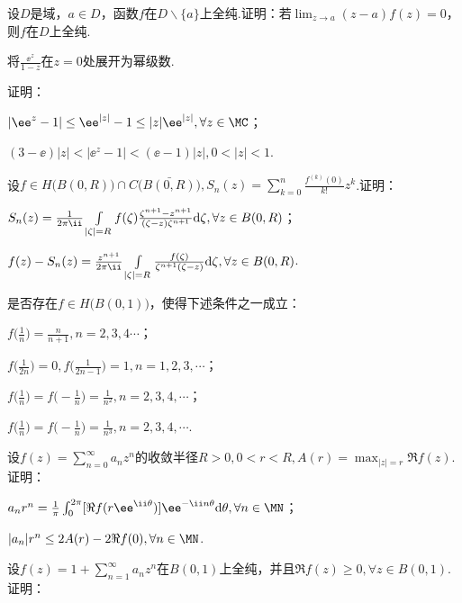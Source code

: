 \begin{xiti}
\item 设$D$是域，$a\in D$，函数$f$在$D\backslash\{a\}$上全纯.证明：若$\lim_{z\to a}(z-a)f(z)=0$，则$f$在$D$上全纯.
\item 将$\frac{\ee^z}{1-z}$在$z=0$处展开为幂级数.
\item 证明：
  \begin{enuma}
    \item $|\ee^z-1|\le\ee^{|z|}-1\le|z|\ee^{|z|},\forall z\in \MC$；
    \item $(3-\ee)|z|<|\ee^z-1|<(\ee-1)|z|,0<|z|<1$.
  \end{enuma}
\item 设$f\in H\big(B(0,R)\big)\cap C\big(\bar{B(0,R)}\big),S_n(z)=\sum_{k=0}^n
\frac{f^{(k)}(0)}{k!}z^k$.证明：
\begin{enuma}
  \item $S_n(z)=\frac1{2\pi\ii}\int\limits_{|\zeta|=R}f(\zeta)\frac{\zeta^{n+1}-z^{n+1}}
      {(\zeta-z)\zeta^{n+1}}\textrm d\zeta,\forall z\in B(0,R)$；
  \item $f(z)-S_n(z)=\frac{z^{n+1}}{2\pi\ii}\int\limits_{|\zeta|=R}
  \frac{f(\zeta)}{\zeta^{n+1}(\zeta-z)}\textrm d\zeta,\forall z\in B(0,R)$.
\end{enuma}
\item 是否存在$f\in H\big(B(0,1)\big)$，使得下述条件之一成立：
\begin{enuma}
  \item $f\bigg(\frac1n\bigg)=\frac n{n+1},n=2,3,4\cdots$；
  \item $f\bigg(\frac1{2n}\bigg)=0,f\bigg(\frac1{2n-1}\bigg)=1,n=1,2,3,\cdots$；
  \item $f\bigg(\frac1n\bigg)=f\bigg(-\frac1n\bigg)=\frac1{n^2},n=2,3,4,\cdots$；
  \item $f\bigg(\frac1n\bigg)=f\bigg(-\frac1n\bigg)=\frac1{n^3},n=2,3,4,\cdots$.
\end{enuma}
\item 设$f(z)=\sum_{n=0}^\infty a_nz^n$的收敛半径$R>0,0<r<R,A(r)=\max_{|z|=r}
\Re f(z)$. 证明：
\begin{enuma}
  \item $a_nr^n=\frac1\pi\int_0^{2\pi}[\Re f(r\ee^{\ii\theta})]\ee^{-\ii n\theta}\textrm d\theta,\forall n\in \MN$；
  \item $|a_n|r^n\le 2A(r)-2\Re f(0),\forall n\in \MN$.
\end{enuma}
\item 设$f(z)=1+\sum_{n=1}^\infty a_nz^n$在$B(0,1)$上全纯，并且$\Re f(z)\ge0,\forall z\in B(0,1)$.证明：

\end{xiti}
